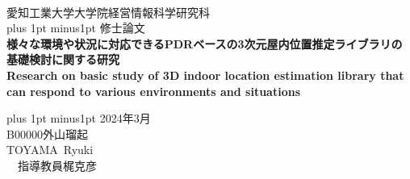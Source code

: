 \begin{titlepage}
    \begin{center}

        \ \vspace{19mm}

        \LARGE\baselineskip=13mm
        愛知工業大学大学院経営情報科学研究科 \\
        \kanjiskip=12pt plus 1pt minus1pt
        修士論文 \\[1mm]

        {\Huge\baselineskip=13mm
        \textbf{様々な環境や状況に対応できるPDRベースの3次元屋内位置推定ライブラリの基礎検討に関する研究} \\
        \textbf{
        Research on basic study of 3D indoor location estimation library that can respond to various environments and situations} \\
        }

        \vspace{80mm}

        \kanjiskip=9pt plus 1pt minus1pt
        2024年3月 \\
        B00000\hspace{1zw}外山瑠起 \\
        TOYAMA\ Ryuki \\
        \ \hbox{\kanjiskip=0pt 指導教員}\hspace{1zw}梶克彦\hspace{1zw}

    \end{center}
\end{titlepage}

